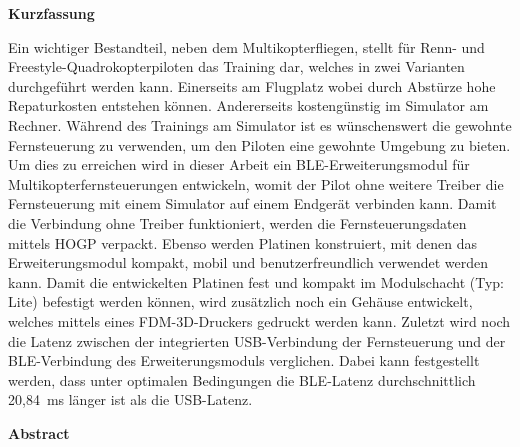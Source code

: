 
\pagestyle{empty}

\newenvironment{abstractpage}
  {\cleardoublepage\vspace*{\fill}\thispagestyle{empty}}
  {\vfill\cleardoublepage}
\newenvironment{abstractsection}[1]
  {\bigskip
   \begin{center}\bfseries#1\end{center}}
  {\par\bigskip}

\begin{abstractpage}
    \begin{abstractsection}{Kurzfassung}
      Ein wichtiger Bestandteil, neben dem Multikopterfliegen, stellt für Renn- und Freestyle-Quadrokopterpiloten das Training dar, welches in zwei Varianten durchgeführt werden kann. Einerseits am Flugplatz wobei durch Abstürze hohe Repaturkosten entstehen können. Andererseits kostengünstig im Simulator am Rechner. Während des Trainings am Simulator ist es wünschenswert die gewohnte Fernsteuerung zu verwenden, um den Piloten eine gewohnte Umgebung zu bieten. Um dies zu erreichen wird in dieser Arbeit ein \acs{BLE}-Erweiterungsmodul für Multikopterfernsteuerungen entwickeln, womit der Pilot ohne weitere Treiber die Fernsteuerung mit einem Simulator auf einem Endgerät verbinden kann. Damit die Verbindung ohne Treiber funktioniert, werden die Fernsteuerungsdaten mittels \acs{HOGP} verpackt. Ebenso werden Platinen konstruiert, mit denen das Erweiterungsmodul kompakt, mobil und benutzerfreundlich verwendet werden kann. Damit die entwickelten Platinen fest und kompakt im Modulschacht (Typ: Lite) befestigt werden können, wird zusätzlich noch ein Gehäuse entwickelt, welches mittels eines \acs{FDM}-3D-Druckers gedruckt werden kann. Zuletzt wird noch die Latenz zwischen der integrierten USB-Verbindung der Fernsteuerung und der \acs{BLE}-Verbindung des Erweiterungsmoduls verglichen. Dabei kann festgestellt werden, dass unter optimalen Bedingungen die \acs{BLE}-Latenz durchschnittlich 20,84~ms länger ist als die USB-Latenz. 
    \end{abstractsection}

    \begin{abstractsection}{Abstract}
    \end{abstractsection}
\end{abstractpage}